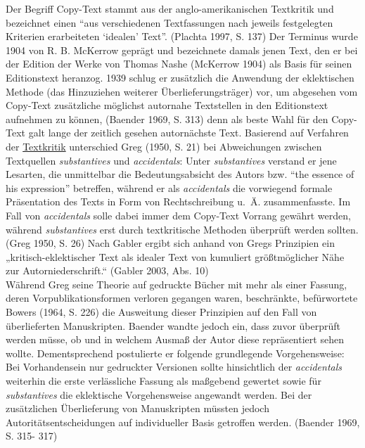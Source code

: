 \documentclass{article}
\begin{document}
    Der Begriff Copy-Text stammt aus der anglo-amerikanischen Textkritik und
                  bezeichnet einen “aus verschiedenen Textfassungen nach jeweils festgelegten
                  Kriterien erarbeiteten ‘idealen’ Text”. (Plachta 1997, S. 137) Der
                  Terminus wurde 1904 von R. B. McKerrow geprägt und bezeichnete damals jenen Text,
                  den er bei der Edition der Werke von Thomas Nashe (McKerrow 1904) als
                  Basis für seinen Editionstext heranzog. 1939 schlug er zusätzlich die Anwendung
                  der eklektischen Methode (das Hinzuziehen weiterer Überlieferungsträger) vor, um
                  abgesehen vom Copy-Text zusätzliche möglichst autornahe Textstellen in den
                  Editionstext aufnehmen zu können, (Baender 1969, S. 313) denn als
                  beste Wahl für den Copy-Text galt lange der zeitlich gesehen autornächste Text.
                  Basierend auf Verfahren der \href{http://gams.uni-graz.at/o:konde.192}{Textkritik} unterschied Greg (1950, S. 21) bei Abweichungen
                  zwischen Textquellen \emph{substantives} und \emph{accidentals}: Unter \emph{substantives} verstand er jene
                  Lesarten, die unmittelbar die Bedeutungsabsicht des Autors bzw. “the essence of
                  his expression” betreffen, während er als \emph{accidentals} die
                  vorwiegend formale Präsentation des Texts in Form von Rechtschreibung u. Ä.
                  zusammenfasste. Im Fall von \emph{accidentals} solle dabei immer
                  dem Copy-Text Vorrang gewährt werden, während \emph{substantives}
                  erst durch textkritische Methoden überprüft werden sollten. (Greg 1950, S.
                     26) Nach Gabler ergibt sich anhand von Gregs Prinzipien ein
                  „kritisch-eklektischer Text als idealer Text von kumuliert größtmöglicher Nähe zur
                  Autorniederschrift.“ (Gabler 2003, Abs. 10)\\
            
        Während Greg seine Theorie auf gedruckte Bücher mit mehr als einer Fassung, deren
                  Vorpublikationsformen verloren gegangen waren, beschränkte, befürwortete Bowers
                     (1964, S. 226) die Ausweitung dieser Prinzipien auf den Fall von
                  überlieferten Manuskripten. Baender wandte jedoch ein, dass zuvor überprüft werden
                  müsse, ob und in welchem Ausmaß der Autor diese repräsentiert sehen wollte.
                  Dementsprechend postulierte er folgende grundlegende Vorgehensweise: Bei
                  Vorhandensein nur gedruckter Versionen sollte hinsichtlich der\emph{
                     accidentals} weiterhin die erste verlässliche Fassung als maßgebend
                  gewertet sowie für \emph{substantives} die eklektische
                  Vorgehensweise angewandt werden. Bei der zusätzlichen Überlieferung von
                  Manuskripten müssten jedoch Autoritätsentscheidungen auf individueller Basis
                  getroffen werden. (Baender 1969, S. 315- 317)\\
            
\end{document}
